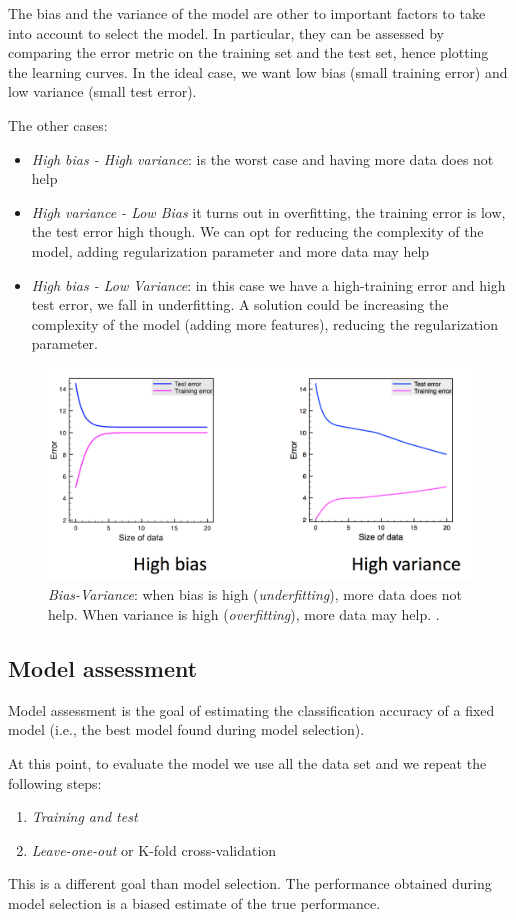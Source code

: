 The bias and the variance of the model are other to important factors to take into account to select the model. In particular, they can be assessed by comparing the error metric on the training set and the test set, hence plotting the learning curves. In the ideal case, we want low bias (small training error) and low variance (small test error).

The other cases:
\begin{itemize}
\item \emph{High bias - High variance}: is the worst case and having more data does not help

\item \emph{High variance - Low Bias} it turns out in overfitting, the training error is low, the test error high though. We can opt for reducing the complexity of the model, adding regularization parameter and more data may help

\item \emph{High bias - Low Variance}: in this case we have a high-training error and high test error, we fall in underfitting. A solution could be increasing the complexity of the model (adding more features), reducing the regularization parameter.
\end{itemize}

\begin{figure}[H]%
 \centering
 \includegraphics[width=13cm]{./img/08/bias_variance}
 \caption{\label{pic:bias_variance} \emph{Bias-Variance}: when bias is high (\emph{underfitting}), more data does not help. When variance is high (\emph{overfitting}), more data may help.
.}
\end{figure}

\subsection{Model assessment}

Model assessment is the goal of estimating the classification accuracy of a fixed model (i.e., the best model found during model selection).

At this point, to evaluate the model we use all the data set and we repeat the following steps:
\begin{enumerate}
\item \emph{Training and test}
\item \emph{Leave-one-out} or {K-fold cross-validation}
\end{enumerate}

This is a different goal than model selection. The performance obtained during model selection is a biased estimate of the true performance.